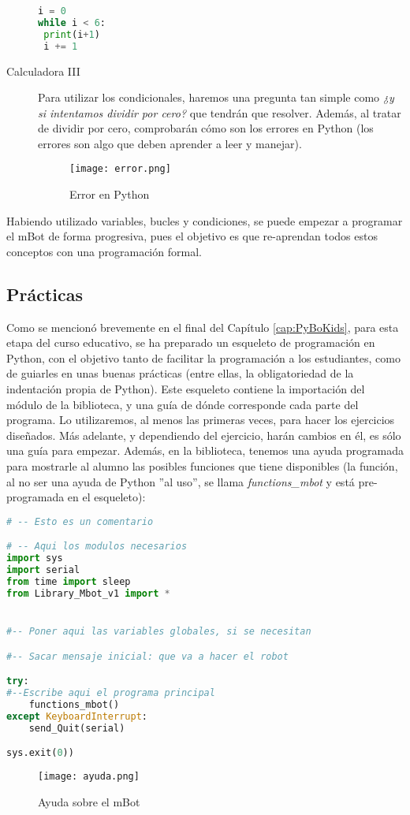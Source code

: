 \begin{description}
\begin{lstlisting}[language=python]
i = 0
while i < 6:
 print(i+1)
 i += 1
\end{lstlisting}
\item [Calculadora III] Para utilizar los condicionales, haremos una pregunta tan simple como \textit{¿y si intentamos dividir por cero?} que tendrán que resolver. Además, al tratar de dividir por cero, comprobarán cómo son los errores en Python (los errores son algo que deben aprender a leer y manejar).
\begin{figure}[H]
	\texttt{[image: error.png]}
	\centering
	\label{img:error}
	\caption{Error en Python}
\end{figure}
\end{description}

Habiendo utilizado variables, bucles y condiciones, se puede empezar a programar el mBot de forma progresiva, pues el objetivo es que re-aprendan todos estos conceptos con una programación formal.
\subsection{Prácticas}
Como se mencionó brevemente en el final del Capítulo \ref{cap:PyBoKids}, para esta etapa del curso educativo, se ha preparado un esqueleto de programación en Python, con el objetivo tanto de facilitar la programación a los estudiantes, como de guiarles en unas buenas prácticas (entre ellas, la obligatoriedad de la indentación propia de Python). Este esqueleto contiene la importación del módulo de la biblioteca, y una guía de dónde corresponde cada parte del programa. Lo utilizaremos, al menos las primeras veces, para hacer los ejercicios diseñados. Más adelante, y dependiendo del ejercicio, harán cambios en él, es sólo una guía para empezar. Además, en la biblioteca, tenemos una ayuda programada para mostrarle al alumno las posibles funciones que tiene disponibles (la función, al no ser una ayuda de Python ''al uso'', se llama \textit{functions\_mbot} y está pre-programada en el esqueleto):

\begin{lstlisting}[language=python]
# -- Esto es un comentario

# -- Aqui los modulos necesarios
import sys
import serial
from time import sleep
from Library_Mbot_v1 import *


#-- Poner aqui las variables globales, si se necesitan

#-- Sacar mensaje inicial: que va a hacer el robot

try:
#--Escribe aqui el programa principal
	functions_mbot()
except KeyboardInterrupt:
	send_Quit(serial)

sys.exit(0))
\end{lstlisting}
\begin{figure}[H]
	\texttt{[image: ayuda.png]}
	\centering
	\label{img:ayuda}
	\caption{Ayuda sobre el mBot}
\end{figure}

